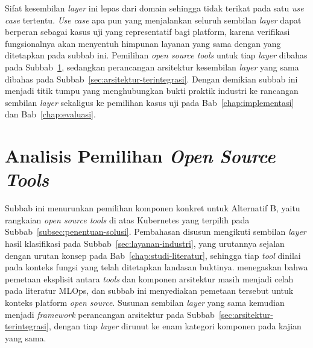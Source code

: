 

Sifat kesembilan \textit{layer} ini lepas dari domain sehingga tidak terikat pada satu \textit{use case} tertentu. \textit{Use case} apa pun yang menjalankan seluruh sembilan \textit{layer} dapat berperan sebagai kasus uji yang representatif bagi platform, karena verifikasi fungsionalnya akan menyentuh himpunan layanan yang sama dengan yang ditetapkan pada subbab ini. Pemilihan \textit{open source tools} untuk tiap \textit{layer} dibahas pada Subbab~\ref{sec:pemilihan-tools}, sedangkan perancangan arsitektur kesembilan \textit{layer} yang sama dibahas pada Subbab~\ref{sec:arsitektur-terintegrasi}. Dengan demikian subbab ini menjadi titik tumpu yang menghubungkan bukti praktik industri ke rancangan sembilan \textit{layer} sekaligus ke pemilihan kasus uji pada Bab~\ref{chap:implementasi} dan Bab~\ref{chap:evaluasi}.

\section{Analisis Pemilihan \textit{Open Source Tools}}
\label{sec:pemilihan-tools}

Subbab ini menurunkan pemilihan komponen konkret untuk Alternatif B, yaitu rangkaian \textit{open source tools} di atas Kubernetes yang terpilih pada Subbab~\ref{subsec:penentuan-solusi}. Pembahasan disusun mengikuti sembilan \textit{layer} hasil klasifikasi pada Subbab~\ref{sec:layanan-industri}, yang urutannya sejalan dengan urutan konsep pada Bab~\ref{chap:studi-literatur}, sehingga tiap \textit{tool} dinilai pada konteks fungsi yang telah ditetapkan landasan buktinya. \textcite{najafabadi2024analysis} menegaskan bahwa pemetaan eksplisit antara \textit{tools} dan komponen arsitektur masih menjadi celah pada literatur MLOps, dan subbab ini menyediakan pemetaan tersebut untuk konteks platform \textit{open source}. Susunan sembilan \textit{layer} yang sama kemudian menjadi \textit{framework} perancangan arsitektur pada Subbab~\ref{sec:arsitektur-terintegrasi}, dengan tiap \textit{layer} dirunut ke enam kategori komponen pada kajian yang sama.

